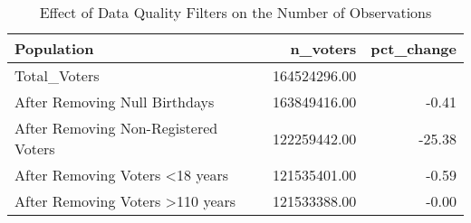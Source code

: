 \begin{table}[!htb]
\centering
\caption{Effect of Data Quality Filters on the Number of Observations} 
\label{table:midterm_pres}
\begingroup\small
\begin{tabular}{lrr}
  \hline
Population & n_voters & pct_change \\ 
  \hline
Total_Voters & 164524296.00 &  \\ 
  After Removing Null Birthdays & 163849416.00 & -0.41 \\ 
  After Removing Non-Registered Voters & 122259442.00 & -25.38 \\ 
  After Removing Voters <18 years & 121535401.00 & -0.59 \\ 
  After Removing Voters >110 years & 121533388.00 & -0.00 \\ 
   \hline
\end{tabular}
\endgroup
\end{table}

